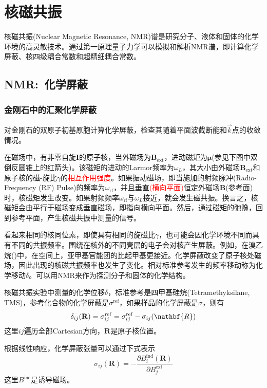 \section{核磁共振}
核磁共振\textrm{(Nuclear Magnetic Resonance, NMR)}谱是研究分子、液体和固体的化学环境的高灵敏技术。通过第一原理量子力学可以模拟和解析\textrm{NMR}谱，即计算化学屏蔽、核四级耦合常数和超精细耦合常数。

\subsection{\rm{NMR}:~化学屏蔽}
\subsubsection{金刚石中的汇聚化学屏蔽}
对金刚石的双原子初基原胞计算化学屏蔽，检查其随着平面波截断能和$\vec k$点的收敛情况。

在磁场中，有非零自旋$\mathbf{I}$的原子核，当外磁场为$\mathbf{B}_{\mathrm{ext}}$，进动磁矩为$\mathbf{\mu}$(参见下图中双倒反圆锥上的红箭头)。该磁矩的进动的\textrm{Larmor}频率为$\omega_L$，其大小由外磁场$\mathbf{B}_{\mathrm{ext}}$和原子核的磁-旋比$\gamma$的\textcolor{red}{相互作用强度}。如果振动磁场，即当施加的射频脉冲\textrm{(Radio-Frequency (RF) Pulse)}的频率为$\omega_{\mathrm{rf}}$，并且垂直\textcolor{red}{(横向平面)}恒定外磁场$\mathbf{B}$(参考面)时，核磁矩发生改变。如果射频频率$\omega_{\mathrm{rf}}$与$\omega_L$接近，就会发生磁共振。换言之，核磁矩会由平行于磁场变成垂直磁场，即指向横向平面。然后，通过磁矩的弛豫，回到参考平面，产生核磁共振中测量的信号。

看起来相同的核同位素，即使具有相同的旋磁比$\gamma$，也可能会因化学环境不同而具有不同的共振频率。围绕在核外的不同壳层的电子会对核产生屏蔽。例如，在溴乙烷()中，在空间上，亚甲基官能团的比起甲基更接近。化学屏蔽改变了原子核处磁场，因此出现的核磁共振频率也发生了变化。相对标准参考发生的频率移动称为化学移动$\delta$。可以用\textrm{NMR}来作为探测分子和固体的化学结构。

核磁共振实验中测量的化学位移$\delta$，标准参考是四甲基硅烷\textrm{(Tetramethyksilane, TMS)}，参考化合物的化学屏蔽是$\sigma^{\mathrm{ref}}$，如果样品的化学屏蔽是$\sigma$，则有
\begin{displaymath}
	\delta_{ij}(\mathbf{R})=\sigma_{ij}^{\mathrm{ref}}=\sigma_{ij}^{\mathrm{ref}}-\sigma_{ij}(\nathbf{R})
\end{displaymath}
这里$ij$遍历全部\textrm{Cartesian}方向，$\mathbf{R}$是原子核位置。

根据线性响应，化学屏蔽张量可以通过下式表示
\begin{displaymath}
	\sigma_{ij}(\mathbf{R})=-\dfrac{\partial B_i^{\mathrm{ind}}(\mathbf{R})}{\partial B_j^{\mathrm{ext}}}
\end{displaymath}
这里$B^{\mathrm{inc}}$是诱导磁场。

